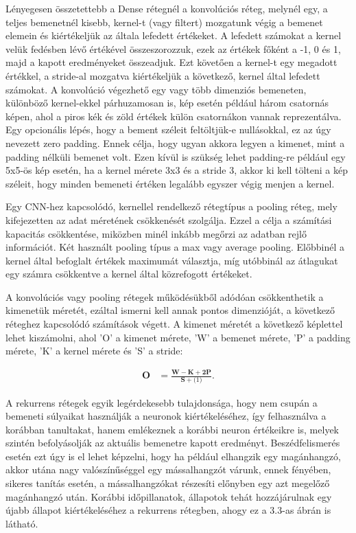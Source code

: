 Lényegesen összetettebb a Dense rétegnél a konvolúciós réteg\cite{cnn}, melynél egy, a teljes bemenetnél kisebb, kernel-t (vagy filtert) mozgatunk végig a bemenet elemein és kiértékeljük az általa lefedett értékeket. A lefedett számokat a kernel velük fedésben lévő értékével összeszorozzuk, ezek az értékek főként a -1, 0 és 1, majd a kapott eredményeket összeadjuk. Ezt követően a kernel-t egy megadott értékkel, a stride-al mozgatva kiértékeljük a következő, kernel által lefedett számokat. A konvolúció végezhető egy vagy több dimenziós bemeneten, különböző kernel-ekkel párhuzamosan is, kép esetén például három csatornás képen, ahol a piros kék és zöld értékek külön csatornákon vannak reprezentálva. Egy opcionális lépés, hogy a bement széleit feltöltjük-e nullásokkal, ez az úgy nevezett zero padding. Ennek célja, hogy ugyan akkora legyen a kimenet, mint a padding nélküli bemenet volt. Ezen kívül is szükség lehet padding-re például egy 5x5-ös kép esetén, ha a kernel mérete 3x3 és a stride 3, akkor ki kell tölteni a kép széleit, hogy minden bemeneti értéken legalább egyszer végig menjen a kernel.

Egy CNN-hez kapcsolódó, kernellel rendelkező rétegtípus a pooling réteg, mely kifejezetten az adat méretének csökkenését szolgálja. Ezzel a célja a számítási kapacitás csökkentése, miközben minél inkább megőrzi az adatban rejlő információt. Két használt pooling típus a max vagy average pooling. Előbbinél a kernel által befoglalt értékek maximumát választja, míg utóbbinál az átlagukat egy számra csökkentve a kernel által közrefogott értékeket.

A konvolúciós vagy pooling rétegek működésükből adódóan csökkenthetik a kimenetük méretét, ezáltal ismerni kell annak pontos dimenzióját, a következő réteghez kapcsolódó számítások végett. A kimenet méretét a következő képlettel lehet kiszámolni, ahol ’O’ a kimenet mérete, ’W’ a bemenet mérete, ’P’ a padding mérete, ’K’ a kernel mérete és ’S’ a stride:

\begin{align}
\mathbf{O}&=\frac{\mathbf{W}-\mathbf{K}+\mathbf{2P}}{\mathbf{S}+\mathbf(1)}.
\end{align}

A rekurrens rétegek\cite{rnn} egyik legérdekesebb tulajdonsága, hogy nem csupán a bemeneti súlyaikat használják a neuronok kiértékeléséhez, így felhasználva a korábban tanultakat, hanem emlékeznek a korábbi neuron értékeikre is, melyek szintén befolyásolják az aktuális bemenetre kapott eredményt. Beszédfelismerés esetén ezt úgy is el lehet képzelni, hogy ha például elhangzik egy magánhangzó, akkor utána nagy valószínűséggel egy mássalhangzót várunk, ennek fényében, sikeres tanítás esetén, a mássalhangzókat részesíti előnyben egy azt megelőző magánhangzó után. Korábbi időpillanatok, állapotok tehát hozzájárulnak egy újabb állapot kiértékeléséhez a rekurrens rétegben, ahogy ez a 3.3-as ábrán is látható.
 
